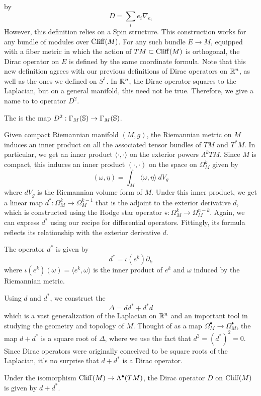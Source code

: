 by
\[
D = \sum_i e_i \nabla_{e_i}
\]
However, this definition relies on a Spin structure. This construction works
for any bundle of modules over $\Cliff(M)$. For any such bundle $E \to M$, equipped
with a fiber metric in which the action of $TM \subset \Cliff(M)$ is orthogonal, the
Dirac operator on $E$ is defined by the same coordinate formula.
Note that this new definition agrees with our previous definitions of Dirac operators on
$\R^n$, as well as the ones we defined on $S^1$. In $\R^n$, the Dirac operator squares to
the Laplacian, but on a general manifold, this need not be true. Therefore, we
give a name to to operator $D^2$.
%
\begin{defn}
The  is the map $D^2 : \Gamma_M(\S) \to \Gamma_M(\S)$.
\end{defn}

Given compact Riemannian manifold $(M,g)$, the Riemannian metric on $M$ induces an
inner product on all the associated tensor bundles of $TM$ and $T^*M$. In
particular, we get an inner product $\langle \cdot,\cdot \rangle $ on the exterior
powers $\Lambda^kTM$. Since $M$ is compact, this induces an inner product
$(\cdot, \cdot)$ on the space on $\Omega_M^k$ given by
\[
(\omega,\eta) = \int_M \langle \omega, \eta \rangle~dV_g
\]
where $dV_g$ is the Riemannian volume form of $M$. Under this inner product,
we get a linear map $d^* : \Omega^k_M \to \Omega^{k-1}_M$ that is the adjoint to the
exterior derivative $d$, which is constructed using the Hodge star operator
$\star : \Omega^k_M \to \Omega_M^{n-k}$. Again, we can express $d^*$ using our
recipe for differential operators. Fittingly, its formula reflects its relationship
with the exterior derivative $d$.
%
\begin{prop}
The operator $d^*$ is given by
\[
d^* = \iota(e^k)\partial_k
\]
where $\iota(e^k)(\omega) = \langle e^k, \omega \rangle$ is the inner product of
$e^k$ and $\omega$ induced by the Riemannian metric.
\end{prop}
%
Using $d$ and $d^*$, we construct the 
\[
\Delta = dd^* + d^*d
\]
which is a vast generalization of the Laplacian on $\R^n$ and an important tool in
studying the geometry and topology of $M$. Thought of as a
map $\Omega^\bullet_M \to \Omega_M^\bullet$, the map $d + d^*$ is a square root
of $\Delta$, where we use the fact that $d^2 = (d^*)^2 = 0$. Since Dirac operators
were originally conceived to be square roots of the Laplacian, it's no surprise
that $d + d^*$ is a Dirac operator.
%
\begin{thm}
Under the isomorphism $\Cliff(M) \to \Lambda^\bullet(TM)$, the Dirac operator $D$
on $\Cliff(M)$ is given by $d + d^*$.
\end{thm}
